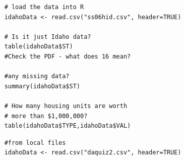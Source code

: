 \documentclass{beamer}
\begin{document}
\begin{frame}[fragile]

\begin{framed}
	\begin{verbatim}	
	# load the data into R
	idahoData <- read.csv("ss06hid.csv", header=TRUE)
	
	# Is it just Idaho data?
	table(idahoData$ST)
	#Check the PDF - what does 16 mean?
	
	#any missing data?
	summary(idahoData$ST)
	
	# How many housing units are worth
	# more than $1,000,000?
	table(idahoData$TYPE,idahoData$VAL)
	\end{verbatim}
\end{framed}

\end{frame}


\begin{frame}[fragile]

\begin{framed}
	\begin{verbatim}
	#from local files
	idahoData <- read.csv("daquiz2.csv", header=TRUE)
	
	\end{verbatim}
\end{framed}

\end{frame}

\end{document}
